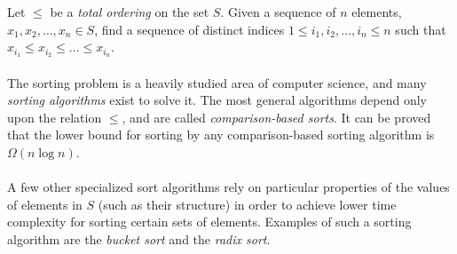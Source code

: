 \documentclass[12pt]{article}
\begin{document}
Let $\leq$ be a \emph{total ordering} on the set $S$.
Given a sequence of $n$ elements, $x_1, x_2, \dots, x_n \in S$, find a sequence
of distinct indices $1 \leq i_1, i_2, \dots, i_n \leq n$ such that $x_{i_1} \leq x_{i_2} \leq \dots \leq x_{i_n}$.
\\
\\
The sorting problem is a heavily studied area of computer science, and many \emph{sorting algorithms} exist to
solve it.  The most general algorithms depend only upon the relation $\leq$, and are called \emph{comparison-based sorts}.
It can be proved that the lower bound for sorting by any comparison-based sorting algorithm is $\Omega(n\log{n})$.
\\
\\
A few other specialized sort algorithms rely on particular properties of the values of elements in $S$ (such as their structure) in order
to achieve lower time complexity for sorting certain sets of elements.  Examples of such a sorting algorithm are
the \emph{bucket sort} and the \emph{radix sort}.
\end{document}
